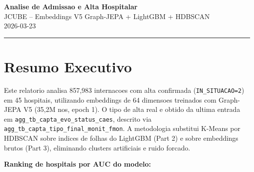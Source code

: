 \documentclass[11pt,a4paper]{article}
\begin{document}
\begin{center}
{\LARGE \textbf{Analise de Admissao e Alta Hospitalar}}\\[4pt]
{\large JCUBE -- Embeddings V5 Graph-JEPA + LightGBM + HDBSCAN}\\[2pt]
{\normalsize 2026-03-23}
\end{center}
\vspace{6pt}
\noindent\rule{\textwidth}{0.4pt}
\vspace{6pt}

\section{Resumo Executivo}
Este relatorio analisa 857,983 internacoes com alta confirmada (\texttt{IN\_SITUACAO=2}) em 45 hospitais, utilizando embeddings de 64 dimensoes treinados com Graph-JEPA V5 (35,2M nos, epoch 1). O tipo de alta real e obtido da ultima entrada em \texttt{agg\_tb\_capta\_evo\_status\_caes}, descrito via \texttt{agg\_tb\_capta\_tipo\_final\_monit\_fmon}. A metodologia substitui K-Means por HDBSCAN sobre indices de folhas do LightGBM (Part 2) e sobre embeddings brutos (Part 3), eliminando clusters artificiais e ruido forcado.

\vspace{4pt}\noindent\textbf{Ranking de hospitais por AUC do modelo:}
\end{document}

